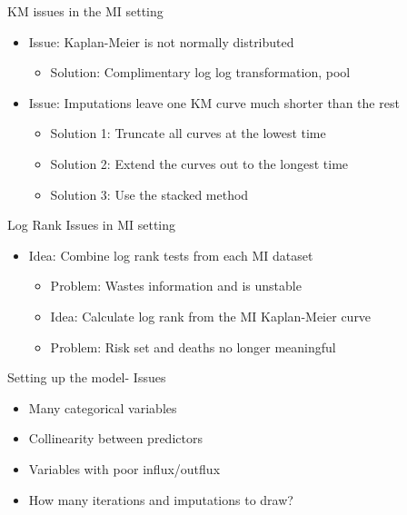 \begin{frame}{KM issues in the MI setting}
\begin{itemize}
\item Issue: Kaplan-Meier is not normally distributed
  \begin{itemize}
   \item Solution: Complimentary log log transformation, pool \cite{Marshall2009}
  \end{itemize}
  \item Issue: Imputations leave one KM curve much shorter than the rest
  \begin{itemize}
   \item Solution 1: Truncate all curves at the lowest time
   \item Solution 2: Extend the curves out to the longest time
   \item Solution 3: Use the stacked method
  \end{itemize}

\end{itemize}
\end{frame}

\begin{frame}{Log Rank Issues in MI setting}
\begin{itemize}
  \item Idea: Combine log rank tests from each MI dataset
  \begin{itemize}
  \item Problem: Wastes information and is unstable \cite{Marshall2009}
  \item Idea: Calculate log rank from the MI Kaplan-Meier curve
  \item Problem: Risk set and deaths no longer meaningful
  \end{itemize}
\end{itemize}
\end{frame}

\begin{frame}{Setting up the model- Issues}
\begin{itemize}
 \item Many categorical variables 
 \item Collinearity between predictors
 \item Variables with poor influx/outflux \cite{VanBuuren2012}
 \item How many iterations and imputations to draw?
\end{itemize}

\end{frame}


